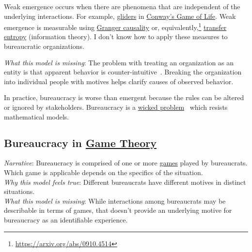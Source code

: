 Weak emergence occurs when there are phenomena that are independent of the underlying interactions. For example, \href{https://en.wikipedia.org/wiki/Glider_(Conway\%27s_Life)}{gliders} 
in \href{https://en.wikipedia.org/wiki/Conway\%27s_Game_of_Life}{Conway's Game of Life}.
Weak emergence is measurable using \href{https://en.wikipedia.org/wiki/Granger_causality}{Granger causality} 
or, equivalently,\footnote{\href{https://arxiv.org/abs/0910.4514}{https://arxiv.org/abs/0910.4514}} \href{https://en.wikipedia.org/wiki/Transfer_entropy}{transfer entropy} 
(information theory). I don't know how to apply these measures to bureaucratic organizations. 

\textit{What this model is missing}: The problem with treating an organization as an entity is that apparent behavior is counter-intuitive~\cite{2002_Gall}. Breaking the organization into individual people with motives helps clarify causes of observed behavior. 

In practice, bureaucracy is worse than emergent because the rules can be altered or ignored by  stakeholders. Bureaucracy is a \href{https://en.wikipedia.org/wiki/Wicked_problem}{wicked problem}~\cite{1973_Rittel} 
\iftoggle{WPinmargin}{\marginpar{[Wikipedia] wicked\\problem}}{}
which resists mathematical models. 

\subsection*{Bureaucracy in \href{https://en.wikipedia.org/wiki/Game_theory}{Game Theory}}
\textit{Narrative}: Bureaucracy is comprised of one or more \href{https://en.wikipedia.org/wiki/List_of_games_in_game_theory}{games} 
played by bureaucrats. Which game is applicable depends on the specifics of the situation. \\
\textit{Why this model feels true}: Different bureaucrats have different motives in distinct situations. \\
\textit{What this model is missing}: While interactions among bureaucrats may be describable in terms of games, that doesn't provide an underlying motive for bureaucracy as an identifiable experience.  

